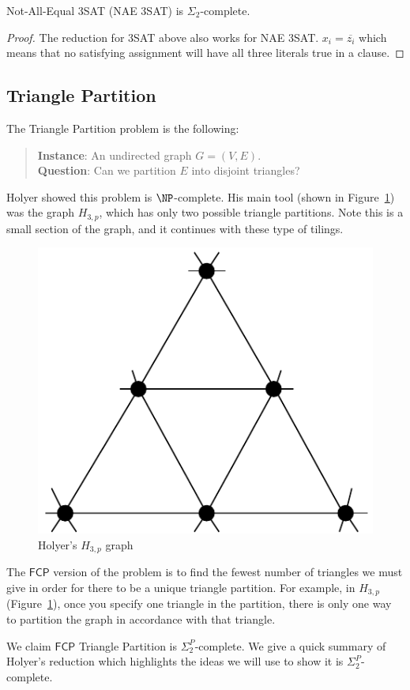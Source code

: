 \documentclass[runningheads,a4paper]{llncs}
\begin{document}
\begin{corollary}
Not-All-Equal 3SAT (NAE 3SAT) is $\Sigma_2$-complete.
\end{corollary}

\begin{proof}
The reduction for 3SAT above also works for NAE 3SAT. $x_i = \overline{z_i}$ which means that no satisfying assignment will have all three literals true in a clause. 
\end{proof}

\subsection{Triangle Partition}\label{S:TP}

The Triangle Partition problem is the following:
\begin{quote}
\textbf{Instance}: An undirected graph $G = (V, E)$.\\
\textbf{Question}: Can we partition $E$ into disjoint triangles?
\end{quote}

Holyer \cite{holyer1981np} showed this problem is $\NP$-complete. His main tool (shown in Figure~\ref{fig:holyergraph}) was the graph $H_{3, p}$, which has only two possible triangle partitions. Note this is a small section of the graph, and it continues with these type of tilings.
\begin{figure}
\label{fig:holyergraph}
\centering
\includegraphics[width=0.4\linewidth]{Holyergraph.pdf}
\caption{Holyer's $H_{3,p}$ graph}
\end{figure}

The $\mathsf{FCP}$ version of the problem is to find the fewest number of triangles we must give in order for there to be a unique triangle partition. For example, in $H_{3,p}$ (Figure~\ref{fig:holyergraph}), once you specify one triangle in the partition, there is only one way to partition the graph in accordance with that triangle.

We claim $\mathsf{FCP}$ Triangle Partition is $\Sigma_2^P$-complete. We give a quick summary of Holyer's reduction which highlights the ideas we will use to show it is $\Sigma_2^P$-complete. 
\end{document}
